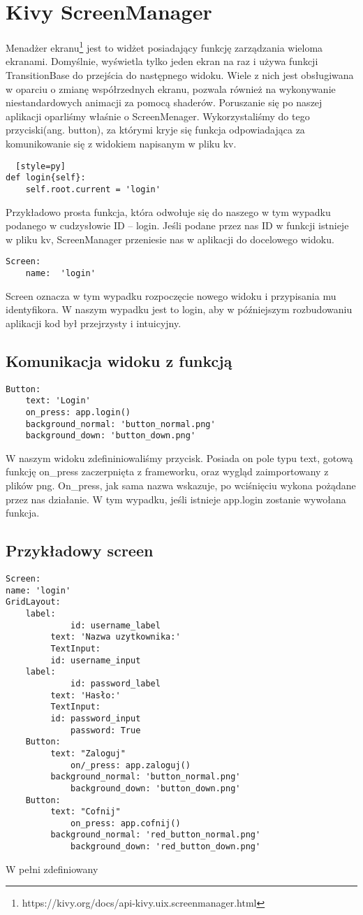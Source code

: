 \documentclass{xmgr}
\begin{document}
\section{Kivy ScreenManager}
Menadżer ekranu\footnote{https://kivy.org/docs/api-kivy.uix.screenmanager.html} jest to widżet posiadający funkcję zarządzania wieloma ekranami. Domyślnie, wyświetla tylko jeden ekran na raz i używa funkcji TransitionBase do przejścia do następnego widoku. Wiele z nich jest obsługiwana w oparciu o zmianę współrzednych ekranu, pozwala również na wykonywanie niestandardowych animacji za pomocą shaderów.
Poruszanie się po naszej aplikacji oparliśmy właśnie o ScreenMenager. Wykorzystaliśmy do tego przyciski(ang. button), za którymi kryje się funkcja odpowiadająca za komunikowanie się z widokiem napisanym w pliku kv. 

\begin{lstlisting}  [style=py] 
def login{self}:
	self.root.current = 'login'
\end{lstlisting}	
Przykładowo prosta funkcja, która odwołuje się do naszego w tym wypadku podanego w cudzysłowie ID -- login. Jeśli podane przez nas ID w funkcji istnieje w pliku kv, ScreenManager przeniesie nas w aplikacji do docelowego widoku. 
\begin{lstlisting}  
Screen:
	name:  'login'
\end{lstlisting}
Screen oznacza w tym wypadku rozpoczęcie nowego widoku i przypisania mu identyfikora. W naszym wypadku jest to login, aby w późniejszym rozbudowaniu aplikacji kod był przejrzysty i intuicyjny. 
\subsection{Komunikacja widoku z funkcją}
\begin{lstlisting}  
Button:
	text: 'Login'
	on_press: app.login()
	background_normal: 'button_normal.png'
	background_down: 'button_down.png'
\end{lstlisting}
W naszym widoku zdefininiowaliśmy przycisk. Posiada on pole typu text, gotową funkcję on\_press zaczerpnięta z frameworku, oraz wygląd zaimportowany z plików png. On\_press, jak sama nazwa wskazuje, po wciśnięciu wykona pożądane przez nas działanie. W tym wypadku, jeśli istnieje app.login zostanie wywołana funkcja.  
\subsection{Przykładowy screen}
\begin{lstlisting} 
Screen:
name: 'login'
GridLayout:
	label:
             id: username_label
	     text: 'Nazwa uzytkownika:'
	     TextInput:
	     id: username_input
	label:
             id: password_label
	     text: 'Hasło:'
	     TextInput:
	     id: password_input
             password: True
	Button:
	     text: "Zaloguj"
             on/_press: app.zaloguj()
	     background_normal: 'button_normal.png'
             background_down: 'button_down.png'		
	Button:
	     text: "Cofnij"
             on_press: app.cofnij()
	     background_normal: 'red_button_normal.png'
             background_down: 'red_button_down.png'
\end{lstlisting}
W pełni zdefiniowany
\end{document}
